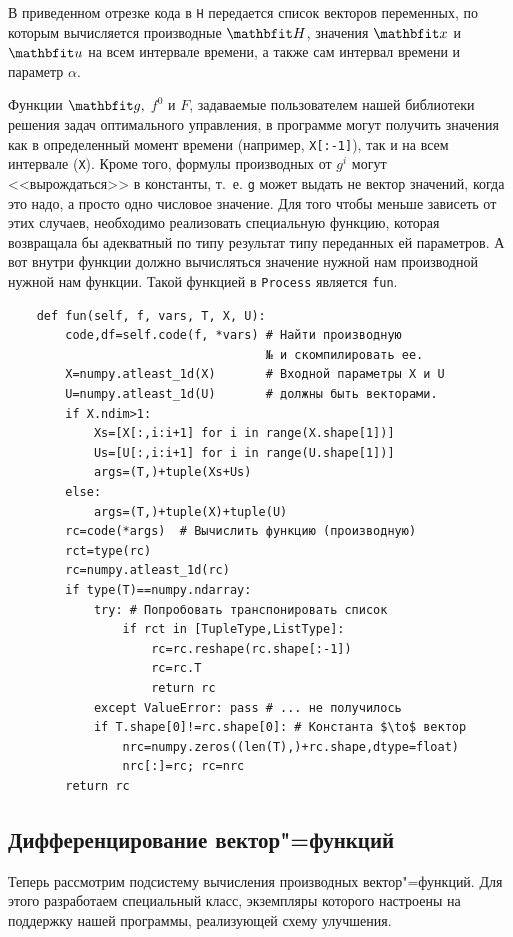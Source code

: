 \documentclass[a4paper,14pt, openany, twoside, draft]{extbook} %
\begin{document}
В приведенном отрезке кода в \texttt{H} передается список векторов переменных, по которым вычисляется производные $\vecH$, значения $\vecx$ и $\vecu$ на всем интервале времени, а также сам интервал времени и параметр $\alpha$.

Функции $\vecg,$ $f^0$ и $F$, задаваемые пользователем нашей библиотеки решения задач оптимального управления, в программе могут получить значения как в определенный момент времени (например, \texttt{X[:-1]}), так и на всем интервале (\texttt{X}).  Кроме того, формулы производных от $g^i$ могут <<вырождаться>> в константы, т.~е. \texttt{g} может выдать не вектор значений, когда это надо, а просто одно числовое значение.  Для того чтобы меньше зависеть от этих случаев, необходимо реализовать специальную функцию, которая возвращала бы адекватный по типу результат типу переданных ей параметров.  А вот внутри функции должно вычисляться значение нужной нам производной нужной нам функции.  Такой функцией в \texttt{Process} является \texttt{fun}.

\begin{verbatim}
    def fun(self, f, vars, T, X, U):
        code,df=self.code(f, *vars) # Найти производную
                                    № и скомпилировать ее.
        X=numpy.atleast_1d(X)       # Входной параметры X и U
        U=numpy.atleast_1d(U)       # должны быть векторами.
        if X.ndim>1:
            Xs=[X[:,i:i+1] for i in range(X.shape[1])]
            Us=[U[:,i:i+1] for i in range(U.shape[1])]
            args=(T,)+tuple(Xs+Us)
        else:
            args=(T,)+tuple(X)+tuple(U)
        rc=code(*args)  # Вычислить функцию (производную)
        rct=type(rc)
        rc=numpy.atleast_1d(rc)
        if type(T)==numpy.ndarray:
            try: # Попробовать транспонировать список
                if rct in [TupleType,ListType]:
                    rc=rc.reshape(rc.shape[:-1])
                    rc=rc.T
                    return rc
            except ValueError: pass # ... не получилось
            if T.shape[0]!=rc.shape[0]: # Константа $\to$ вектор
                nrc=numpy.zeros((len(T),)+rc.shape,dtype=float)
                nrc[:]=rc; rc=nrc
        return rc
\end{verbatim}

\subsection{Дифференцирование вектор"=функций}
\label{sec:VFdiff}

Теперь рассмотрим подсистему вычисления производных вектор"=функций.  Для этого разработаем специальный класс, экземпляры которого настроены на поддержку нашей программы, реализующей схему улучшения.
\end{document}
